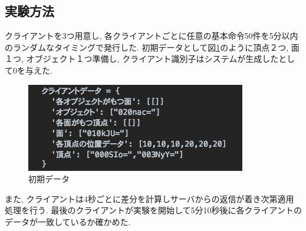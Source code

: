 \subsection{実験方法}
クライアントを3つ用意し, 各クライアントごとに任意の基本命令50件を5分以内のランダムなタイミングで発行した. 初期データとして図\ref{init}のように頂点２つ, 面１つ, オブジェクト１つ準備し, クライアント識別子はシステムが生成したとして0を与えた.
\begin{figure}[htbp]
 \begin{center}
	 \includegraphics[scale=0.7]{images/init}
	 \caption{初期データ}
	 \label{init}
 \end{center}
\end{figure}
また, クライアントは4秒ごとに差分を計算しサーバからの返信が着き次第適用処理を行う. 最後のクライアントが実験を開始して5分10秒後に各クライアントのデータが一致しているか確かめた.
